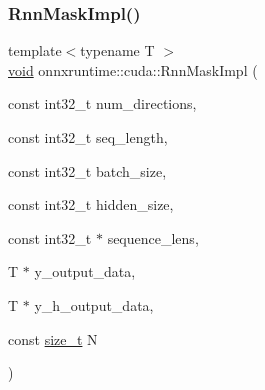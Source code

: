 \mbox{\label{namespaceonnxruntime_1_1cuda_a26415486136df0da0e096efc908ab00e}} 
\subsubsection{\texorpdfstring{Rnn\+Mask\+Impl()}{RnnMaskImpl()}}
{\footnotesize\ttfamily template$<$typename T $>$ \\
\mbox{\hyperlink{mlasi_8h_a88f941d423cb2a819b70a1358982b1a6}{void}} onnxruntime\+::cuda\+::\+Rnn\+Mask\+Impl (\begin{DoxyParamCaption}\item[{const int32\+\_\+t}]{num\+\_\+directions,  }\item[{const int32\+\_\+t}]{seq\+\_\+length,  }\item[{const int32\+\_\+t}]{batch\+\_\+size,  }\item[{const int32\+\_\+t}]{hidden\+\_\+size,  }\item[{const int32\+\_\+t $\ast$}]{sequence\+\_\+lens,  }\item[{T $\ast$}]{y\+\_\+output\+\_\+data,  }\item[{T $\ast$}]{y\+\_\+h\+\_\+output\+\_\+data,  }\item[{const \mbox{\hyperlink{mlasi_8h_a503efbc1c6e50825320ad909366b78ab}{size\+\_\+t}}}]{N }\end{DoxyParamCaption})}

\mbox{\label{namespaceonnxruntime_1_1cuda_a678b6e6f4618cbc0b55e3a68111d894d}} 
